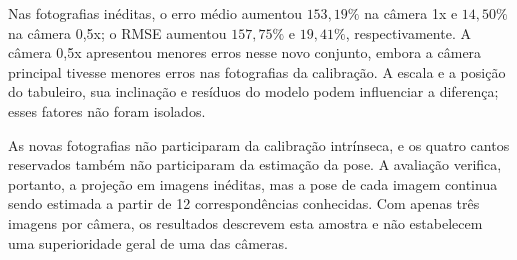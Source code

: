 \FloatBarrier
Nas fotografias inéditas, o erro médio aumentou $153{,}19\%$ na câmera 1x
e $14{,}50\%$ na câmera 0,5x; o RMSE aumentou $157{,}75\%$ e $19{,}41\%$,
respectivamente. A câmera 0,5x apresentou menores erros nesse novo conjunto,
embora a câmera principal tivesse menores erros nas fotografias da calibração.
A escala e a posição do tabuleiro, sua inclinação e resíduos do modelo podem
influenciar a diferença; esses fatores não foram isolados.

As novas fotografias não participaram da calibração intrínseca, e os quatro
cantos reservados também não participaram da estimação da pose. A avaliação
verifica, portanto, a projeção em imagens inéditas, mas a pose de cada imagem
continua sendo estimada a partir de 12 correspondências conhecidas. Com apenas
três imagens por câmera, os resultados descrevem esta amostra e não estabelecem
uma superioridade geral de uma das câmeras.
